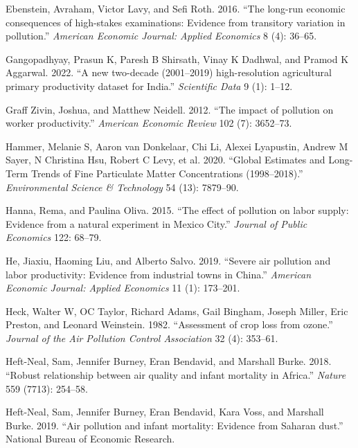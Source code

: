 \documentclass[
]{article}
\newlength{\cslhangindent}
\newlength{\cslentryspacingunit} %
\newenvironment{CSLReferences}[2] %
 {%
  \setlength{\parindent}{0pt}
  \ifodd #1
  \let\oldpar\par
  \def\par{\hangindent=\cslhangindent\oldpar}
  \fi
  \setlength{\parskip}{#2\cslentryspacingunit}
 }%
 {}
\begin{document}
\begin{CSLReferences}{1}{0}
\leavevmode{}%
Ebenstein, Avraham, Victor Lavy, and Sefi Roth. 2016. {``{The long-run economic consequences of high-stakes examinations: Evidence from transitory variation in pollution}.''} \emph{{American Economic Journal: Applied Economics}} 8 (4): 36--65.

\leavevmode{}%
Gangopadhyay, Prasun K, Paresh B Shirsath, Vinay K Dadhwal, and Pramod K Aggarwal. 2022. {``{A new two-decade (2001--2019) high-resolution agricultural primary productivity dataset for India}.''} \emph{{Scientific Data}} 9 (1): 1--12.

\leavevmode{}%
Graff Zivin, Joshua, and Matthew Neidell. 2012. {``{The impact of pollution on worker productivity}.''} \emph{{American Economic Review}} 102 (7): 3652--73.

\leavevmode{}%
Hammer, Melanie S, Aaron van Donkelaar, Chi Li, Alexei Lyapustin, Andrew M Sayer, N Christina Hsu, Robert C Levy, et al. 2020. {``Global Estimates and Long-Term Trends of Fine Particulate Matter Concentrations (1998--2018).''} \emph{{Environmental Science \& Technology}} 54 (13): 7879--90.

\leavevmode{}%
Hanna, Rema, and Paulina Oliva. 2015. {``{The effect of pollution on labor supply: Evidence from a natural experiment in Mexico City}.''} \emph{{Journal of Public Economics}} 122: 68--79.

\leavevmode{}%
He, Jiaxiu, Haoming Liu, and Alberto Salvo. 2019. {``{Severe air pollution and labor productivity: Evidence from industrial towns in China}.''} \emph{{American Economic Journal: Applied Economics}} 11 (1): 173--201.

\leavevmode{}%
Heck, Walter W, OC Taylor, Richard Adams, Gail Bingham, Joseph Miller, Eric Preston, and Leonard Weinstein. 1982. {``{Assessment of crop loss from ozone}.''} \emph{{Journal of the Air Pollution Control Association}} 32 (4): 353--61.

\leavevmode{}%
Heft-Neal, Sam, Jennifer Burney, Eran Bendavid, and Marshall Burke. 2018. {``{Robust relationship between air quality and infant mortality in Africa}.''} \emph{Nature} 559 (7713): 254--58.

\leavevmode{}%
Heft-Neal, Sam, Jennifer Burney, Eran Bendavid, Kara Voss, and Marshall Burke. 2019. {``{Air pollution and infant mortality: Evidence from Saharan dust}.''} {National Bureau of Economic Research}.


\end{CSLReferences}
\end{document}
